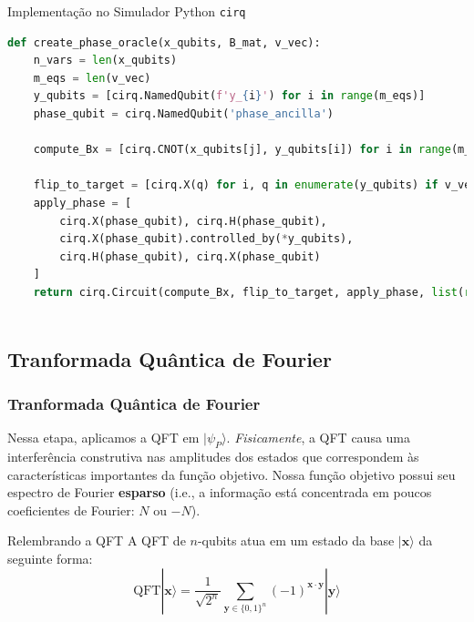 \documentclass[aspectratio=169]{beamer}
\begin{document}
\begin{frame}[fragile]
  
  \begin{block}{Implementação no Simulador Python \lstinline|cirq|}
  \begin{lstlisting}[language=Python, frame=single, basicstyle=\tiny]
def create_phase_oracle(x_qubits, B_mat, v_vec):
    n_vars = len(x_qubits)
    m_eqs = len(v_vec)
    y_qubits = [cirq.NamedQubit(f'y_{i}') for i in range(m_eqs)]
    phase_qubit = cirq.NamedQubit('phase_ancilla')
    
    compute_Bx = [cirq.CNOT(x_qubits[j], y_qubits[i]) for i in range(m_eqs) for j in range(n_vars) \
                                                                                    if B_mat[i, j] == 1]
    flip_to_target = [cirq.X(q) for i, q in enumerate(y_qubits) if v_vec[i] == 0]
    apply_phase = [
        cirq.X(phase_qubit), cirq.H(phase_qubit),
        cirq.X(phase_qubit).controlled_by(*y_qubits),
        cirq.H(phase_qubit), cirq.X(phase_qubit)
    ]
    return cirq.Circuit(compute_Bx, flip_to_target, apply_phase, list(reversed(flip_to_target)), \
                                                                             list(reversed(compute_Bx)))
  \end{lstlisting}
  \end{block}
\end{frame}

\subsection{Tranformada Quântica de Fourier}
\begin{frame}
  \frametitle{Tranformada Quântica de Fourier}

  Nessa etapa, aplicamos a QFT em $|\psi_P\rangle$. 
  \vfill
  \textit{Fisicamente}, a QFT causa uma interferência construtiva nas amplitudes dos estados que correspondem às características importantes da função objetivo. 
  Nossa função objetivo possui seu espectro de Fourier \textbf{esparso} (i.e., a informação está concentrada em poucos coeficientes de Fourier: $N$ ou $-N$).
  
  \begin{block}{Relembrando a QFT}
    A QFT de $n$-qubits atua em um estado da base $|\mathbf{x}\rangle$ da seguinte forma:
    $$
    \text{QFT}|\mathbf{x}\rangle = \frac{1}{\sqrt{2^n}} \sum_{\mathbf{y} \in \{0,1\}^n} (-1)^{\mathbf{x} \cdot \mathbf{y}} |\mathbf{y}\rangle
    $$
  \end{block}
\end{frame}
\end{document}
